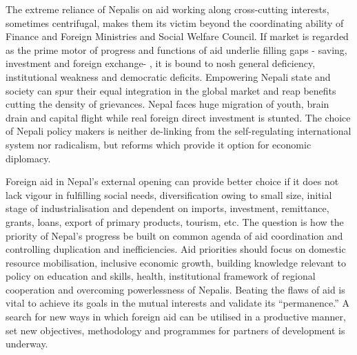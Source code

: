 \documentclass[
  openany]{book}
\begin{document}
The extreme reliance of Nepalis on aid working along cross-cutting interests, sometimes centrifugal, makes them its victim beyond the coordinating ability of Finance and Foreign Ministries and Social Welfare Council. If market is regarded as the prime motor of progress and functions of aid underlie filling gaps - saving, investment and foreign exchange- , it is bound to nosh general deficiency, institutional weakness and democratic deficits. Empowering Nepali state and society can spur their equal integration in the global market and reap benefits cutting the density of grievances. Nepal faces huge migration of youth, brain drain and capital flight while real foreign direct investment is stunted. The choice of Nepali policy makers is neither de-linking from the self-regulating international system nor radicalism, but reforms which provide it option for economic diplomacy.

Foreign aid in Nepal's external opening can provide better choice if it does not lack vigour in fulfilling social needs, diversification owing to small size, initial stage of industrialisation and dependent on imports, investment, remittance, grants, loans, export of primary products, tourism, etc. The question is how the priority of Nepal's progress be built on common agenda of aid coordination and controlling duplication and inefficiencies. Aid priorities should focus on domestic resource mobilisation, inclusive economic growth, building knowledge relevant to policy on education and skills, health, institutional framework of regional cooperation and overcoming powerlessness of Nepalis. Beating the flaws of aid is vital to achieve its goals in the mutual interests and validate its ``permanence.'' A search for new ways in which foreign aid can be utilised in a productive manner, set new objectives, methodology and programmes for partners of development is underway.
\end{document}
